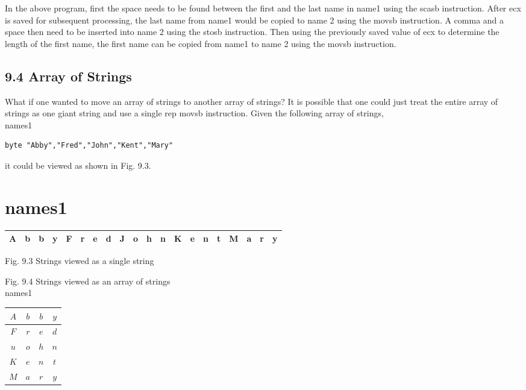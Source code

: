 \documentclass[10pt]{article}
\begin{document}
In the above program, first the space needs to be found between the first and the last name in name1 using the scasb instruction. After ecx is saved for subsequent processing, the last name from name1 would be copied to name 2 using the movsb instruction. A comma and a space then need to be inserted into name 2 using the stosb instruction. Then using the previously saved value of ecx to determine the length of the first name, the first name can be copied from name1 to name 2 using the movsb instruction.

\subsection*{9.4 Array of Strings}
What if one wanted to move an array of strings to another array of strings? It is possible that one could just treat the entire array of strings as one giant string and use a single rep movsb instruction. Given the following array of strings,\\
names1

\begin{verbatim}
byte "Abby","Fred","John","Kent","Mary"
\end{verbatim}

it could be viewed as shown in Fig. 9.3.

\section*{names1}
\begin{center}
\begin{tabular}{|c|c|c|c|c|c|c|c|c|c|c|c|c|c|c|c|c|c|c|c|}
\hline
A & b & b & y & F & r & e & d & J & o & h & n & K & e & n & t & M & a & r & y \\
\hline
\end{tabular}
\end{center}

Fig. 9.3 Strings viewed as a single string

Fig. 9.4 Strings viewed as an array of strings\\
names1

\begin{center}
\begin{tabular}{|c|c|c|c|}
\hline
$A$ & $b$ & $b$ & $y$ \\
\hline
$F$ & $r$ & $e$ & $d$ \\
\hline
$u$ & $o$ & $h$ & $n$ \\
\hline
$K$ & $e$ & $n$ & $t$ \\
\hline
$M$ & $a$ & $r$ & $y$ \\
\hline
\end{tabular}
\end{center}
\end{document}

